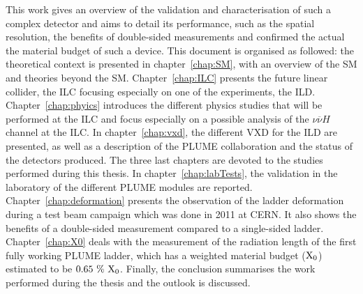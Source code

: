 
  This work gives an overview of the validation and characterisation of such a complex detector and aims to detail its performance, such as the spatial resolution, the benefits of double-sided measurements and confirmed the actual the material budget of such a device.
  This document is organised as followed:
  the theoretical context is presented in chapter~\ref{chap:SM}, with an overview of the \gls{SM} and theories beyond the \gls{SM}.
  Chapter~\ref{chap:ILC} presents the future linear collider, the \gls{ILC} focusing especially on one of the experiments, the \gls{ILD}.
  Chapter~\ref{chap:phyics} introduces the different physics studies that will be performed at the \gls{ILC} and focus especially on a possible analysis of the $\nu\overline{\nu}H$ channel at the \gls{ILC}.
  In chapter~\ref{chap:vxd}, the different \gls{VXD} for the \gls{ILD} are presented, as well as a description of the \gls{PLUME} collaboration and the status of the detectors produced.
  The three last chapters are devoted to the studies performed during this thesis.
  In chapter~\ref{chap:labTests}, the validation in the laboratory of the different \gls{PLUME} modules are reported.
  Chapter~\ref{chap:deformation} presents the observation of the ladder deformation during a test beam campaign which was done in 2011 at \gls{CERN}. 
  It also shows the benefits of a double-sided measurement compared to a single-sided ladder.
  Chapter~\ref{chap:X0} deals with the measurement of the radiation length of the first fully working \gls{PLUME} ladder, which has a weighted material budget ($\rm{X_0}$) estimated to be $0.65~\%~\rm{X_0}$.
  Finally, the conclusion summarises the work performed during the thesis and the outlook is discussed.

